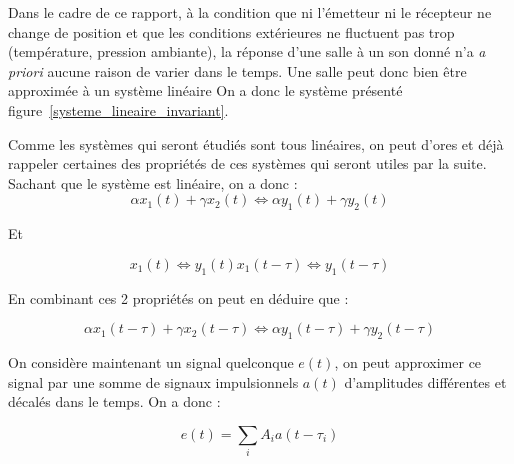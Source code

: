 Dans le cadre de ce rapport, à la condition que ni l'émetteur ni le récepteur ne change de position et que les conditions extérieures ne fluctuent pas trop (température, pression ambiante), la réponse d'une salle à un son donné n'a \textit{a priori} aucune raison de varier dans le temps.
Une salle peut donc bien être approximée à un système linéaire
On a donc le système présenté figure~\ref{systeme_lineaire_invariant}.





Comme les systèmes qui seront étudiés sont tous linéaires, on peut d'ores et déjà rappeler certaines des propriétés de ces systèmes qui seront utiles par la suite.  
Sachant que le système est linéaire, on a donc :
\begin{equation}
    \alpha x_1(t) + \gamma x_2(t) \Leftrightarrow \alpha y_1(t) + \gamma y_2(t)       
\end{equation}

Et

\begin{equation}     
    x_1(t)  \Leftrightarrow y_1(t)                 
    x_1(t -\tau) \Leftrightarrow y_1(t -\tau)                
\end{equation}

En combinant ces 2 propriétés on peut en déduire que :

\begin{equation}       
    \alpha x_1(t - \tau) + \gamma x_2(t - \tau) \Leftrightarrow \alpha y_1(t - \tau) + \gamma y_2(t - \tau)       
\end{equation}

On considère maintenant un signal quelconque $e(t)$, on peut approximer ce signal par une somme de signaux impulsionnels $a(t)$ d'amplitudes différentes et décalés dans le temps.
On a donc :

\begin{equation}        
    e(t) = \sum_{i} A_i a(t - \tau_i)
\end{equation}

